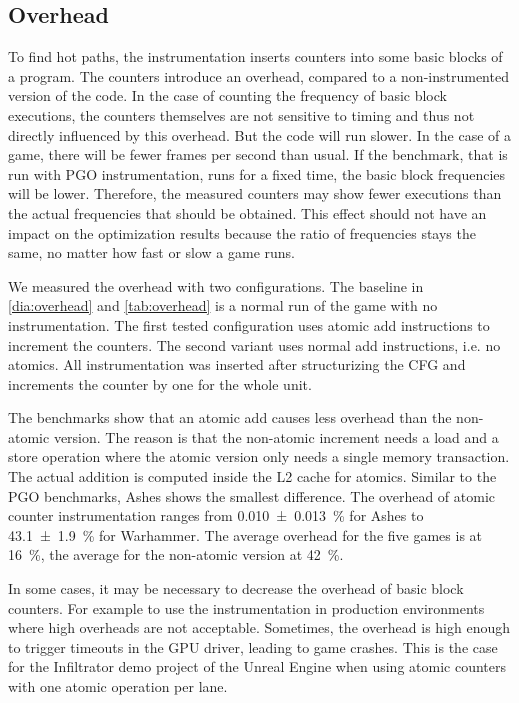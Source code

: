 \subsection{Overhead}
\label{sub:overhead}
To find hot paths, the instrumentation inserts counters into some basic blocks of a program. The counters introduce an overhead, compared to a non-instrumented version of the code.
In the case of counting the frequency of basic block executions, the counters themselves are not sensitive to timing and thus not directly influenced by this overhead.
But the code will run slower. In the case of a game, there will be fewer frames per second than usual.
If the benchmark, that is run with PGO instrumentation, runs for a fixed time, the basic block frequencies will be lower.
Therefore, the measured counters may show fewer executions than the actual frequencies that should be obtained.
This effect should not have an impact on the optimization results because the ratio of frequencies stays the same, no matter how fast or slow a game runs.

We measured the overhead with two configurations.
The baseline in \cref{dia:overhead} and \cref{tab:overhead} is a normal run of the game with no instrumentation.
The first tested configuration uses atomic add instructions to increment the counters.
The second variant uses normal add instructions, i.e. no atomics.
All instrumentation was inserted after structurizing the CFG and increments the counter by one for the whole unit.


\begin{table}
	\centering
	\label{tab:overhead}
\end{table}

The benchmarks show that an atomic add causes less overhead than the non-atomic version.
The reason is that the non-atomic increment needs a load and a store operation where the atomic version only needs a single memory transaction. The actual addition is computed inside the L2 cache for atomics.
Similar to the PGO benchmarks, Ashes shows the smallest difference.
The overhead of atomic counter instrumentation ranges from \SI{0.010 \pm 0.013}{\percent} for Ashes to \SI{43.1 \pm 1.9}{\percent} for Warhammer.
The average overhead for the five games is at \SI{16}{\percent}, the average for the non-atomic version at \SI{42}{\percent}.

In some cases, it may be necessary to decrease the overhead of basic block counters. For example to use the instrumentation in production environments where high overheads are not acceptable.
Sometimes, the overhead is high enough to trigger timeouts in the GPU driver, leading to game crashes. This is the case for the Infiltrator demo project of the Unreal Engine when using atomic counters with one atomic operation per lane.

